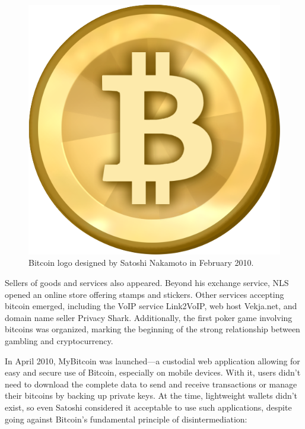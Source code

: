\documentclass[
  a5paper,
  smalldemyvopaper,10pt,twoside,onecolumn,openright,extrafontsizes,hidelinks]{memoir}
\begin{document}
\begin{figure}[H]

{\centering \includegraphics{chapters/img/bitcoin530.png}

}

\caption{Bitcoin logo designed by Satoshi Nakamoto in February 2010.}

\end{figure}%

Sellers of goods and services also appeared. Beyond his exchange
service, NLS opened an online store offering stamps and stickers. Other
services accepting bitcoin emerged, including the VoIP service
Link2VoIP, web host Vekja.net, and domain name seller Privacy Shark.
Additionally, the first poker game involving bitcoins was organized,
marking the beginning of the strong relationship between gambling and
cryptocurrency.

In April 2010, MyBitcoin was launched---a custodial web application
allowing for easy and secure use of Bitcoin, especially on mobile
devices. With it, users didn't need to download the complete data to
send and receive transactions or manage their bitcoins by backing up
private keys. At the time, lightweight wallets didn't exist, so even
Satoshi considered it acceptable to use such applications, despite going
against Bitcoin's fundamental principle of disintermediation:
\end{document}
